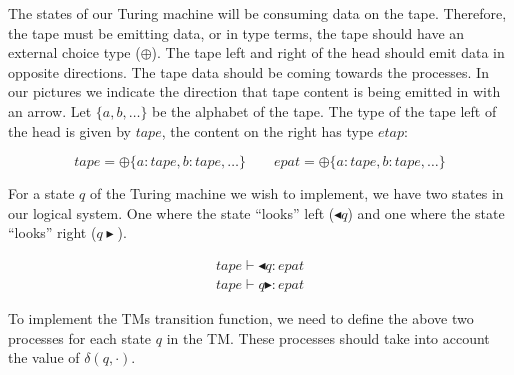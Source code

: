 \documentclass{article}
\begin{document}
	The states of our Turing machine will be consuming data on the tape.
	Therefore, the tape must be emitting data, or in type terms, the tape should have an external choice type (\(\oplus\)). The tape left and right of the head should emit data in opposite directions. The tape data should be coming towards the processes. In our pictures we indicate the direction that tape content is being emitted in with an arrow. Let \(\lbrace a, b, \dots \rbrace\) be the alphabet of the tape. The type of the tape left of the head is given by \(tape\), the content on the right has type \(etap\):
	
	\[
	tape = \oplus\{a:tape, b:tape, \dots\} 
	\qquad
	epat = \oplus\{a:tape, b:tape, \dots\}
	\]
	
	For a state $q$ of the Turing machine we wish to implement, we have two states in our logical system. One where the state ``looks'' left (\(\blacktriangleleft q\)) and one where the state ``looks'' right  (\( q \blacktriangleright\)).
	
	\begin{align*}
	tape \vdash \blacktriangleleft q : epat \\
	tape \vdash q \blacktriangleright : epat 
	\end{align*}
	
	
	To implement the TMs transition function, we need to define the above two processes for each state \(q\) in the TM. These processes should take into account the value of \(\delta(q,\cdot)\).  
	
\end{document}
